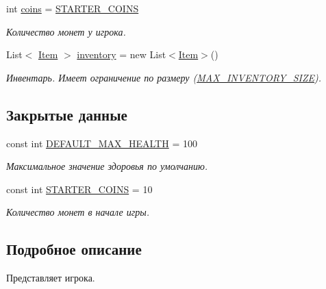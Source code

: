 \begin{DoxyCompactItemize}
int \hyperlink{class_a_s_c_i_i_wars_1_1_game_1_1_player_a5abede19c5428143df924357ad475691}{coins} = \hyperlink{class_a_s_c_i_i_wars_1_1_game_1_1_player_af33b6af0d723918290a4a38aa4a6fb66}{S\+T\+A\+R\+T\+E\+R\+\_\+\+C\+O\+I\+NS}
\begin{DoxyCompactList}\small\item\em Количество монет у игрока. \end{DoxyCompactList}\item 
List$<$ \hyperlink{class_a_s_c_i_i_wars_1_1_game_1_1_item}{Item} $>$ \hyperlink{class_a_s_c_i_i_wars_1_1_game_1_1_player_a04acfaa196162f89bfae7aee5ec45480}{inventory} = new List$<$\hyperlink{class_a_s_c_i_i_wars_1_1_game_1_1_item}{Item}$>$()
\begin{DoxyCompactList}\small\item\em Инвентарь. Имеет ограничение по размеру (\hyperlink{class_a_s_c_i_i_wars_1_1_game_1_1_player_a1cc8a05398a717bcf8c5a0ebd2ea0747}{M\+A\+X\+\_\+\+I\+N\+V\+E\+N\+T\+O\+R\+Y\+\_\+\+S\+I\+ZE}). \end{DoxyCompactList}\end{DoxyCompactItemize}
\subsection*{Закрытые данные}
\begin{DoxyCompactItemize}
\item 
const int \hyperlink{class_a_s_c_i_i_wars_1_1_game_1_1_player_ab5921985db319187e317563c15ef48dc}{D\+E\+F\+A\+U\+L\+T\+\_\+\+M\+A\+X\+\_\+\+H\+E\+A\+L\+TH} = 100
\begin{DoxyCompactList}\small\item\em Максимальное значение здоровья по умолчанию. \end{DoxyCompactList}\item 
const int \hyperlink{class_a_s_c_i_i_wars_1_1_game_1_1_player_af33b6af0d723918290a4a38aa4a6fb66}{S\+T\+A\+R\+T\+E\+R\+\_\+\+C\+O\+I\+NS} = 10
\begin{DoxyCompactList}\small\item\em Количество монет в начале игры. \end{DoxyCompactList}\end{DoxyCompactItemize}


\subsection{Подробное описание}
Представляет игрока. 

